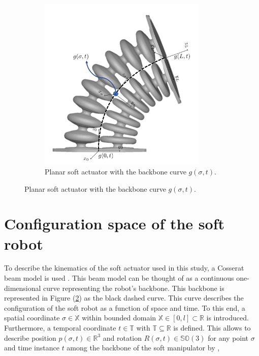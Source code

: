 \begin{figure}[H]
\begin{minipage}{\linewidth}
\begin{minipage}{0.45\linewidth}
\begin{figure}[H]
                 \includegraphics[width=0.88\textwidth]{Figures/Chapter2/actuatorschematic.png}
            \caption{Planar soft actuator with the backbone curve $g(\sigma,t)$.}
            \label{fig2:kinematicschematic}
          \end{figure}
      \end{minipage}
  \end{minipage}
\end{figure}




\section{Configuration space of the soft robot}

To describe the kinematics of the soft actuator used in this study, a Cosserat beam model is used \cite{Boyer2019}. This beam model can be thought of as a continuous one-dimensional curve representing the robot's backbone. This backbone is represented in Figure (\ref{fig2:kinematicschematic}) as the black dashed curve. This curve describes the configuration of the soft robot as a function of space and time. To this end, a spatial coordinate  $\sigma \in \mathbb{X}$ within bounded domain $\mathbb{X} \in [0,l] \subset \mathbb{R}$ is introduced. Furthermore, a temporal coordinate $t \in  \mathbb{T}$ with $\mathbb{T} \subseteq \mathbb{R}$ is defined. This allows to describe position $p(\sigma,t) \in \mathbb{R}^3$ and rotation $R(\sigma,t) \in \mathbb{SO}(3)$ for any point $\sigma$ and time instance $t$ among the backbone of the soft manipulator by \cite{Caasenbrood2020},


